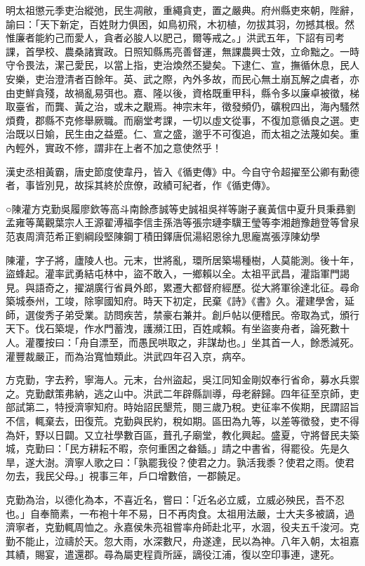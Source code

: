 
\begin{pinyinscope}
明太祖懲元季吏治縱弛，民生凋敝，重繩貪吏，置之嚴典。府州縣吏來朝，陛辭，諭曰：「天下新定，百姓財力俱困，如鳥初飛，木初植，勿拔其羽，勿撼其根。然惟廉者能約己而愛人，貪者必朘人以肥己，爾等戒之。」洪武五年，下詔有司考課，首學校、農桑諸實政。日照知縣馬亮善督運，無課農興士效，立命黜之。一時守令畏法，潔己愛民，以當上指，吏治煥然丕變矣。下逮仁、宣，撫循休息，民人安樂，吏治澄清者百餘年。英、武之際，內外多故，而民心無土崩瓦解之虞者，亦由吏鮮貪殘，故禍亂易弭也。嘉、隆以後，資格既重甲科，縣令多以廉卓被徵，梯取臺省，而龔、黃之治，或未之覯焉。神宗末年，徵發頻仍，礦稅四出，海內騷然煩費，郡縣不克修舉厥職。而廟堂考課，一切以虛文從事，不復加意循良之選。吏治既以日媮，民生由之益蹙。仁、宣之盛，邈乎不可復追，而太祖之法蔑如矣。重內輕外，實政不修，謂非在上者不加之意使然乎！

漢史丞相黃霸，唐史節度使韋丹，皆入《循吏傳》中。今自守令超擢至公卿有勳德者，事皆別見，故採其終於庶僚，政績可紀者，作《循吏傳》。

○陳灌方克勤吳履廖欽等高斗南餘彥誠等史誠祖吳祥等謝子襄黃信中夏升貝秉彞劉孟雍等萬觀葉宗人王源翟溥福李信圭孫浩等張宗璉李驥王瑩等李湘趙豫趙登等曾泉范衷周濟范希正劉綱段堅陳鋼丁積田鐸唐侃湯紹恩徐九思龐嵩張淳陳幼學

陳灌，字子將，廬陵人也。元末，世將亂，環所居築場種樹，人莫能測。後十年，盜蜂起。灌率武勇結屯林中，盜不敢入，一鄉賴以全。太祖平武昌，灌詣軍門謁見。與語奇之，擢湖廣行省員外郎，累遷大都督府經歷。從大將軍徐達北征。尋命築城泰州，工竣，除寧國知府。時天下初定，民棄《詩》《書》久。灌建學舍，延師，選俊秀子弟受業。訪問疾苦，禁豪右兼并。創戶帖以便稽民。帝取為式，頒行天下。伐石築堤，作水門蓄洩，護瀕江田，百姓咸賴。有坐盜麥舟者，論死數十人。灌覆按曰：「舟自漂至，而愚民哄取之，非謀劫也。」坐其首一人，餘悉減死。灌豐裁嚴正，而為治寬恤類此。洪武四年召入京，病卒。

方克勤，字去矜，寧海人。元末，台州盜起，吳江同知金剛奴奉行省命，募水兵禦之。克勤獻策弗納，逃之山中。洪武二年辟縣訓導，母老辭歸。四年征至京師，吏部試第二，特授濟寧知府。時始詔民墾荒，閱三歲乃稅。吏征率不俟期，民謂詔旨不信，輒棄去，田復荒。克勤與民約，稅如期。區田為九等，以差等徵發，吏不得為奸，野以日闢。又立社學數百區，葺孔子廟堂，教化興起。盛夏，守將督民夫築城，克勤曰：「民方耕耘不暇，奈何重困之畚鍤。」請之中書省，得罷役。先是久旱，遂大澍。濟寧人歌之曰：「孰罷我役？使君之力。孰活我黍？使君之雨。使君勿去，我民父母。」視事三年，戶口增數倍，一郡饒足。

克勤為治，以德化為本，不喜近名，嘗曰：「近名必立威，立威必殃民，吾不忍也。」自奉簡素，一布袍十年不易，日不再肉食。太祖用法嚴，士大夫多被謫，過濟寧者，克勤輒周恤之。永嘉侯朱亮祖嘗率舟師赴北平，水涸，役夫五千浚河。克勤不能止，泣禱於天。忽大雨，水深數尺，舟遂達，民以為神。八年入朝，太祖嘉其績，賜宴，遣還郡。尋為屬吏程貢所誣，謫役江浦，復以空印事連，逮死。


\end{pinyinscope}
